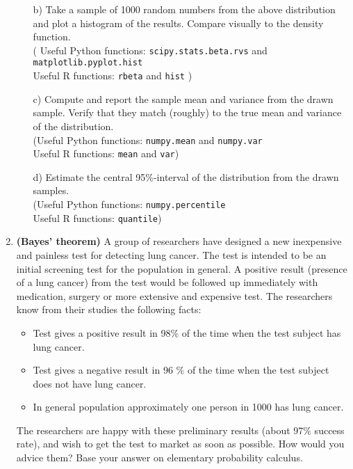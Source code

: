 \documentclass[11pt,a4paper,english]{article}
\begin{document}
\begin{enumerate}
\begin{itemize}
	\item[b)] Take a sample of 1000 random numbers from the above distribution and plot a histogram of the results. Compare visually to the density function.
	\\( Useful Python functions: {\tt scipy.stats.beta.rvs} and {\tt matplotlib.pyplot.hist}\\
	Useful R functions: {\tt rbeta} and {\tt hist} )
	\item[c)] Compute and report the sample mean and variance from the drawn sample. Verify that they match (roughly) to the true mean and variance of the distribution.\\
(Useful Python functions: {\tt numpy.mean} and {\tt numpy.var}\\
Useful R functions: {\tt mean} and {\tt var})
	\item[d)] Estimate the central 95\%-interval of the distribution from the drawn samples.\\
(Useful Python functions: {\tt numpy.percentile}\\ Useful R functions: {\tt quantile})
\end{itemize}



\item {\bf (Bayes' theorem)} A group of researchers have designed a new inexpensive and
  painless test for detecting lung cancer. The test is
  intended to be an initial screening test for the population in
  general. A positive result (presence of a lung cancer) from the test
  would be followed up immediately with medication, surgery or more
  extensive and expensive test. The researchers know from their
  studies the following facts:
  \begin{itemize}
  \setlength{\itemsep}{1pt}
  \item Test gives a positive result in 98$\%$  of the time when the
    test subject has lung cancer.
  \item Test gives a negative result in 96 $\%$ of the time when the
    test subject does not have lung cancer.
  \item In general population approximately one person in 1000 has
    lung cancer.
  \end{itemize}

  The researchers are happy with these preliminary results (about 97$\%$
  success rate), and wish to get the test to market as soon as
  possible. How would you advice them? Base your answer on elementary
  probability calculus.



\end{enumerate}
\end{document}
